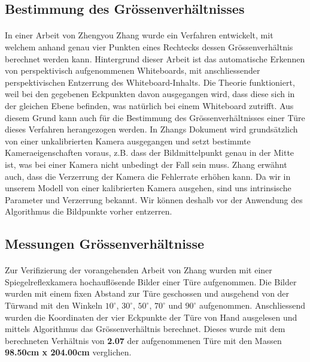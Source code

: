 \subsection{Bestimmung des Grössenverhältnisses}


\paragraph{}
In einer Arbeit von Zhengyou Zhang \cite{zhangrectification} wurde ein Verfahren entwickelt, mit welchem anhand genau vier Punkten eines Rechtecks dessen Grössenverhältnis berechnet werden kann. Hintergrund dieser Arbeit ist das automatische Erkennen von perspektivisch aufgenommenen Whiteboards, mit anschliessender perspektivischen Entzerrung des Whiteboard-Inhalts.
\noindent
Die Theorie funktioniert, weil bei den gegebenen Eckpunkten davon ausgegangen wird, dass diese sich in der gleichen Ebene befinden, was natürlich bei einem Whiteboard zutrifft. Aus diesem Grund kann auch für die Bestimmung des Grössenverhältnisses einer Türe dieses Verfahren herangezogen werden.
\noindent
In Zhangs Dokument wird grundsätzlich von einer unkalibrierten Kamera ausgegangen und setzt bestimmte Kameraeigenschaften voraus, z.B. dass der Bildmittelpunkt genau in der Mitte ist, was bei einer Kamera nicht unbedingt der Fall sein muss. Zhang erwähnt auch, dass die Verzerrung der Kamera die Fehlerrate erhöhen kann. Da wir in unserem Modell von einer kalibrierten Kamera ausgehen, sind uns intrinsische Parameter und Verzerrung bekannt. Wir können deshalb vor der Anwendung des Algorithmus die Bildpunkte vorher entzerren.


\subsection{Messungen Grössenverhältnisse}

\paragraph{}
Zur Verifizierung der vorangehenden Arbeit von Zhang \cite{zhangrectification} wurden mit einer Spiegelreflexkamera hochauflösende Bilder einer Türe aufgenommen. Die Bilder wurden mit einem fixen Abstand zur Türe geschossen und ausgehend von der Türwand mit den Winkeln $10^\circ$, $30^\circ$, $50^\circ$, $70^\circ$ und $90^\circ$ aufgenommen. Anschliessend wurden die Koordinaten der vier Eckpunkte der Türe von Hand ausgelesen und mittels Algorithmus das Grössenverhältnis berechnet. Dieses wurde mit dem berechneten Verhältnis von \textbf{2.07} der aufgenommenen Türe mit den Massen \textbf{98.50cm x 204.00cm} verglichen.

